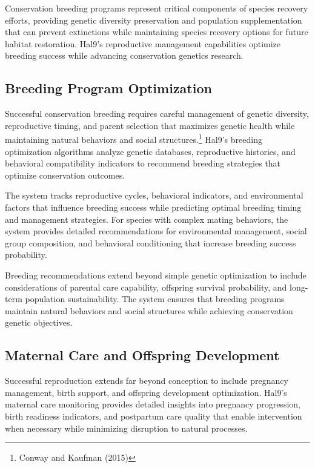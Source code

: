 \documentclass[
  Letterpaper,
]{scrbook}
\begin{document}
Conservation breeding programs represent critical components of species
recovery efforts, providing genetic diversity preservation and
population supplementation that can prevent extinctions while
maintaining species recovery options for future habitat restoration.
Hal9's reproductive management capabilities optimize breeding success
while advancing conservation genetics research.

\subsection{Breeding Program
Optimization}\label{breeding-program-optimization}

Successful conservation breeding requires careful management of genetic
diversity, reproductive timing, and parent selection that maximizes
genetic health while maintaining natural behaviors and social
structures.\footnote{Conway and Kaufman (2015)} Hal9's breeding
optimization algorithms analyze genetic databases, reproductive
histories, and behavioral compatibility indicators to recommend breeding
strategies that optimize conservation outcomes.

The system tracks reproductive cycles, behavioral indicators, and
environmental factors that influence breeding success while predicting
optimal breeding timing and management strategies. For species with
complex mating behaviors, the system provides detailed recommendations
for environmental management, social group composition, and behavioral
conditioning that increase breeding success probability.

Breeding recommendations extend beyond simple genetic optimization to
include considerations of parental care capability, offspring survival
probability, and long-term population sustainability. The system ensures
that breeding programs maintain natural behaviors and social structures
while achieving conservation genetic objectives.

\subsection{Maternal Care and Offspring
Development}\label{maternal-care-and-offspring-development}

Successful reproduction extends far beyond conception to include
pregnancy management, birth support, and offspring development
optimization. Hal9's maternal care monitoring provides detailed insights
into pregnancy progression, birth readiness indicators, and postpartum
care quality that enable intervention when necessary while minimizing
disruption to natural processes.
\end{document}
